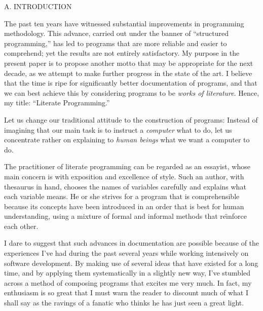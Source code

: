\titlepage
{}
\kern6mm
\CJrule
\kern4.5mm
\kern2pt
\kern4mm
\CJrule
\kern6mm
\bigskip\bigskip
\begindoublecolumns

\beginsection A. INTRODUCTION

The past ten years have witnessed substantial improvements in programming
methodology. This advance, carried out under the banner of ``structured
programming,'' has led to programs that are more reliable and easier to
comprehend; yet the results are not entirely satisfactory. My purpose
in the present paper is to propose another motto that may be appropriate
for the next decade, as we attempt to make further progress in the
state of the art. I believe that the time is ripe for significantly
better documentation of programs, and that we can best achieve this by
considering programs to be {\it works of literature}. Hence, my title:
``Literate Programming.''

Let us change our traditional attitude to the construction of programs:
Instead of imagining that our main task is to instruct a {\it computer\/}
what to do, let us concentrate rather on explaining to {\it human beings\/}
what we want a computer to do.

The practitioner of literate programming can be regarded as an essayist, whose
main concern is with exposition and excellence of style. Such an author,
with thesaurus in hand, chooses the names of variables carefully and explains
what each variable means. He or she strives for a program that is
comprehensible because its concepts have been introduced in an order that
is best for human understanding, using a mixture of formal and informal
methods that re\"\i nforce each other.

I dare to suggest that such advances in documentation are possible because
of the experiences I've had during the past several years while working
intensively on software development. By making use of several ideas that
have existed for a long time, and by applying them systematically in a
slightly new way, I've stumbled across a method of composing programs
that excites me very much. In fact, my enthusiasm is so great that I must warn
the reader to discount much of what I shall say as the ravings of a fanatic
who thinks he has just seen a great light.

